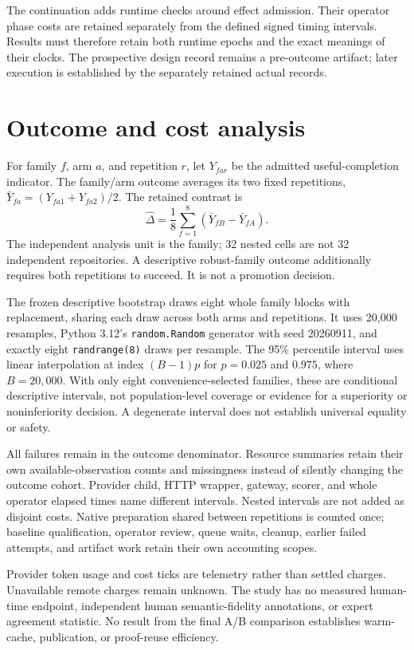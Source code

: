 The continuation adds runtime checks around effect admission. Their operator
phase costs are retained separately from the defined signed timing intervals.
Results must therefore retain both runtime epochs and the exact meanings of
their clocks. The prospective design record remains a pre-outcome artifact;
later execution is established by the separately retained actual records.

\section{Outcome and cost analysis}
\label{sec:frozen-analysis-method}

For family $f$, arm $a$, and repetition $r$, let $Y_{far}$ be the admitted
useful-completion indicator. The family/arm outcome averages its two fixed
repetitions, $\bar Y_{fa}=(Y_{fa1}+Y_{fa2})/2$. The retained contrast is
\[
  \widehat{\Delta}=\frac{1}{8}\sum_{f=1}^{8}
       (\bar Y_{fB}-\bar Y_{fA}).
\]
The independent analysis unit is the family; 32 nested cells are not 32
independent repositories. A descriptive robust-family outcome additionally
requires both repetitions to succeed. It is not a promotion decision.

The frozen descriptive bootstrap draws eight whole family blocks with
replacement, sharing each draw across both arms and repetitions. It uses
20,000 resamples, Python 3.12's \texttt{random.Random} generator with seed
20260911, and exactly eight \texttt{randrange(8)} draws per resample. The
95\% percentile interval uses linear interpolation at index $(B-1)p$ for
$p=0.025$ and $0.975$, where $B=20{,}000$. With only eight convenience-selected
families, these are conditional descriptive intervals, not population-level
coverage or evidence for a superiority or noninferiority decision. A degenerate
interval does not establish universal equality or safety.

All failures remain in the outcome denominator. Resource summaries retain their
own available-observation counts and missingness instead of silently changing
the outcome cohort. Provider child, HTTP wrapper, gateway, scorer, and whole
operator elapsed times name different intervals. Nested intervals are not
added as disjoint costs. Native preparation shared between repetitions is
counted once; baseline qualification, operator review, queue waits, cleanup,
earlier failed attempts, and artifact work retain their own accounting scopes.

Provider token usage and cost ticks are telemetry rather than settled charges.
Unavailable remote charges remain unknown. The study has no measured human-time
endpoint, independent human semantic-fidelity annotations, or expert agreement
statistic. No result from the final A/B comparison establishes warm-cache,
publication, or proof-reuse efficiency.

